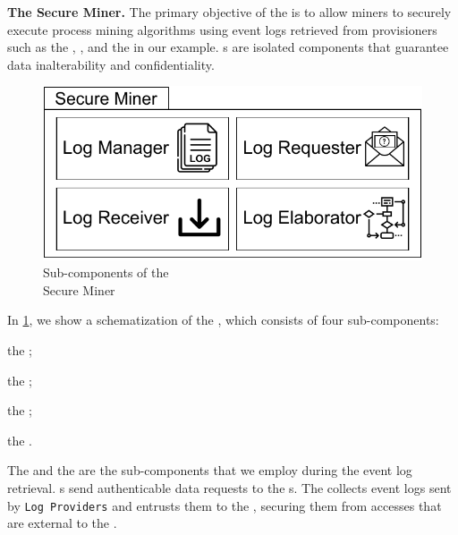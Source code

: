 \noindent\textbf{The Secure Miner.}
The primary objective of the  is to allow miners to securely execute process mining algorithms using event logs retrieved from provisioners such as the , , and the  in our example. s are isolated components that guarantee data inalterability and confidentiality. 

%
\begin{figure}
	\vspace{-1.5em}
	\centering
	\includegraphics[width=1\textwidth]{content/figures/secureminersad.pdf}
	\caption[Secure Miner sub-components]{Sub-components of the \\Secure Miner}
	\label{fig:trusted_miner}
	\vspace{-6pt}
\end{figure}
%
In \cref{fig:trusted_miner}, we show a schematization of the , which consists of four sub-components:
\begin{inparaenum}
    \item the ;
    \item the ;
    \item the ; 
    \item the .
\end{inparaenum}
%
The  and the  are the sub-components that we employ during the event log retrieval. s send authenticable data requests to the s. The  collects event logs sent by \texttt{Log Providers} and entrusts them to the , securing them from accesses that are external to the .
